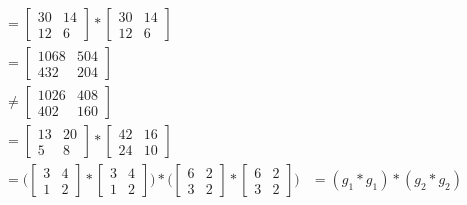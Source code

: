 \documentclass[
  coursecode={MTHE 418},
  assignmentname={Homework \homeworknumber},
  studentnumber=20053722,
  name={Bryan Hoang},
  draft,
]{
  ltxanswer%
}
\begin{document}
\begin{questions}
\begin{parts}
\begin{solution}
\begin{example}
\begin{align*}
                                &= \begin{bmatrix}30 & 14\\12 & 6\end{bmatrix} * \begin{bmatrix}30 & 14 \\12 & 6\end{bmatrix}                                                                                                            \\
                                &= \begin{bmatrix}1068 & 504\\432 & 204\end{bmatrix}                                                                                                                                                     \\
                                &\ne \begin{bmatrix}1026 & 408\\402 & 160\end{bmatrix}                                                                                                                                                   \\
                                &= \begin{bmatrix}13 & 20\\5 & 8\end{bmatrix} * \begin{bmatrix}42 & 16\\24 & 10\end{bmatrix}                                                                                                             \\
                                &= \Biggl(\begin{bmatrix}3 & 4\\1 & 2\end{bmatrix} * \begin{bmatrix}3 & 4\\1 & 2\end{bmatrix}\Biggr) * \Biggl(\begin{bmatrix}6 & 2\\3 & 2\end{bmatrix} * \begin{bmatrix}6 & 2\\3 & 2\end{bmatrix}\Biggr)
                                &= (g_{1} * g_{1}) * (g_{2} * g_{2})                                                                                                                                                                     \\

\end{align*}
\end{example}
\end{solution}
\end{parts}
\end{questions}
\end{document}
